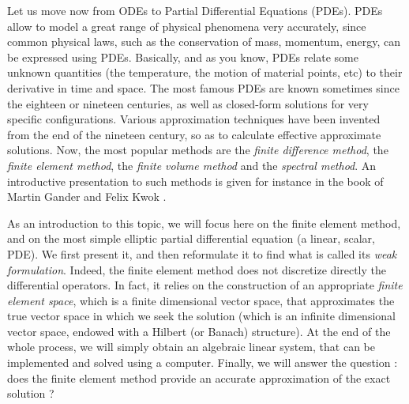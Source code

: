 \documentclass{article}
\begin{document}
Let us move now from ODEs to Partial Differential Equations (PDEs). PDEs allow to model a great range of physical phenomena very accurately, since  common physical laws, such as the conservation of mass, momentum, energy, can be expressed using PDEs. Basically, and as you know, PDEs relate some unknown quantities (the temperature, the motion of material points, etc) to their derivative in time and space. The most famous PDEs are known sometimes since the eighteen or nineteen centuries, as well as closed-form solutions for very specific configurations. Various approximation techniques have been invented from the end of the nineteen century, so as to calculate effective approximate solutions. Now, the most popular methods are the \emph{finite difference method}, the \emph{finite element method}, the \emph{finite volume method} and the \emph{spectral method}. An introductive presentation to such methods is given for instance in the book of Martin Gander and Felix Kwok \cite{gander18b}.

As an introduction to this topic, we will focus here on the finite element method, and on the most simple elliptic partial differential equation (a linear, scalar, PDE). We first present it, and then reformulate it to find what is called its \emph{weak formulation}. Indeed, the finite element method %
does not discretize directly the differential operators. In fact, it relies on the construction of an appropriate \emph{finite element space}, which is a finite dimensional vector space, that approximates the true vector space in which we seek the solution (which is an infinite dimensional vector space, endowed with a Hilbert (or Banach) structure). %
At the end of the whole process, we will simply obtain an algebraic linear system, %
that can be implemented and solved using a computer. Finally, we will answer the question : does the finite element method provide an accurate approximation of the exact solution ? 

\end{document}
